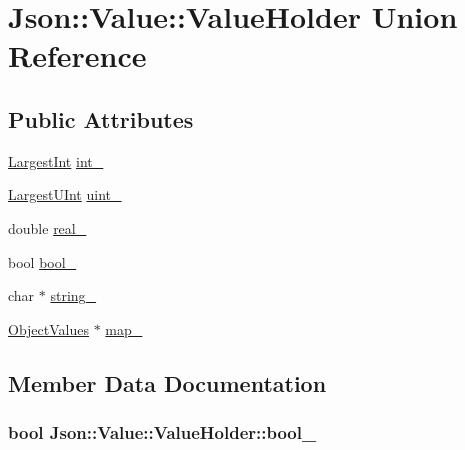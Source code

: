 \hypertarget{unionJson_1_1Value_1_1ValueHolder}{}\section{Json\+:\+:Value\+:\+:Value\+Holder Union Reference}
\label{unionJson_1_1Value_1_1ValueHolder}
\subsection*{Public Attributes}
\begin{DoxyCompactItemize}
\item 
\hyperlink{classJson_1_1Value_a1cbb82642ed05109b9833e49f042ece7}{Largest\+Int} \hyperlink{unionJson_1_1Value_1_1ValueHolder_adbfb384301298844ed955ba5cf6015a0}{int\+\_\+}
\item 
\hyperlink{classJson_1_1Value_a6682a3684d635e03fc06ba229fa24eec}{Largest\+U\+Int} \hyperlink{unionJson_1_1Value_1_1ValueHolder_aab65665dc15a24a29a8e93cdeeaa7e50}{uint\+\_\+}
\item 
double \hyperlink{unionJson_1_1Value_1_1ValueHolder_af0c5ca724e5fe3a15db773d750e2351e}{real\+\_\+}
\item 
bool \hyperlink{unionJson_1_1Value_1_1ValueHolder_a92edab1861dadbfefd8be5fd4285eefe}{bool\+\_\+}
\item 
char $\ast$ \hyperlink{unionJson_1_1Value_1_1ValueHolder_a70ac2b153bc405527baa3850d2ddc3cb}{string\+\_\+}
\item 
\hyperlink{classJson_1_1Value_a08b6c80c3af7071d908dabf044de5388}{Object\+Values} $\ast$ \hyperlink{unionJson_1_1Value_1_1ValueHolder_a1e7a5b86d4f52234f55c847ad1ce389a}{map\+\_\+}
\end{DoxyCompactItemize}


\subsection{Member Data Documentation}
\subsubsection[{\texorpdfstring{bool\+\_\+}{bool_}}]{\setlength{\rightskip}{0pt plus 5cm}bool Json\+::\+Value\+::\+Value\+Holder\+::bool\+\_\+}\hypertarget{unionJson_1_1Value_1_1ValueHolder_a92edab1861dadbfefd8be5fd4285eefe}{}\label{unionJson_1_1Value_1_1ValueHolder_a92edab1861dadbfefd8be5fd4285eefe}
